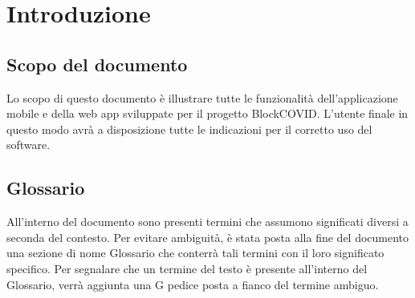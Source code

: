 \section{Introduzione}

\subsection{Scopo del documento}
Lo scopo di questo documento è illustrare tutte le funzionalità dell'applicazione mobile e della web app sviluppate per il progetto BlockCOVID. L'utente finale in questo modo avrà a disposizione tutte le indicazioni per il corretto uso del software.

\subsection{Glossario}
All’interno del documento sono presenti termini che assumono significati diversi a seconda del contesto. Per evitare ambiguità, è stata posta alla fine del documento una sezione di nome Glossario che conterrà tali termini con il loro significato specifico. Per segnalare che un termine del testo è presente all’interno del Glossario, verrà aggiunta una G pedice posta a fianco del termine ambiguo.